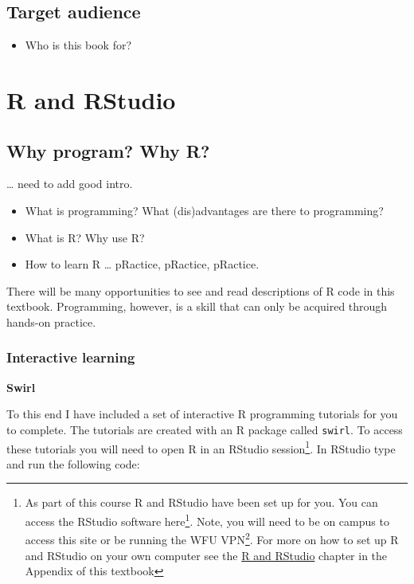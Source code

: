 \documentclass[]{book}
\renewcommand{\href}[2]{#2\footnote{\url{#1}}}
\providecommand{\tightlist}{%
  \setlength{\itemsep}{0pt}\setlength{\parskip}{0pt}}
\let\rmarkdownfootnote\footnote%
\def\footnote{\protect\rmarkdownfootnote}
\begin{document}
\hypertarget{target-audience}{%
\subsection{Target audience}\label{target-audience}}

\begin{itemize}
\tightlist
\item
  Who is this book for?
\end{itemize}

\hypertarget{r-and-rstudio}{%
\section{R and RStudio}\label{r-and-rstudio}}

\hypertarget{why-program-why-r}{%
\subsection{Why program? Why R?}\label{why-program-why-r}}

\ldots{} need to add good intro.

\begin{itemize}
\tightlist
\item
  What is programming? What (dis)advantages are there to programming?
\item
  What is R? Why use R?
\item
  How to learn R \ldots{} pRactice, pRactice, pRactice.
\end{itemize}

There will be many opportunities to see and read descriptions of R code in this textbook. Programming, however, is a skill that can only be acquired through hands-on practice.

\hypertarget{interactive-learning}{%
\subsubsection{Interactive learning}\label{interactive-learning}}

\textbf{Swirl}

To this end I have included a set of interactive R programming tutorials for you to complete. The tutorials are created with an R package called \texttt{swirl}. To access these tutorials you will need to open R in an RStudio session\footnote{As part of this course R and RStudio have been set up for you. You can access the RStudio software \href{http://10.1.0.5/rstudio/}{here}. Note, you will need to be on campus to access this site or be running the \href{http://help.wfu.edu/vpninstall}{WFU VPN}. For more on how to set up R and RStudio on your own computer see the \protect\hyperlink{rsetup}{R and RStudio} chapter in the Appendix of this textbook}. In RStudio type and run the following code:
\end{document}
